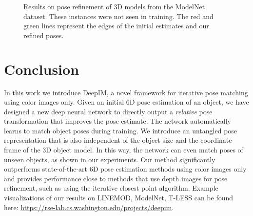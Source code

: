 \documentclass[twocolumn]{svjour3}
\newcommand{\dimnet}[0]{DeepIM}
\begin{document}
\begin{figure*}[!ht]
{}
\hfill
{}
\hfill
{}
\hfill
\caption{Results on pose refinement of 3D models from the ModelNet dataset. These instances were not seen in training. The red and green lines represent the edges of the initial estimates and our refined poses.}
\label{fig.unseen_demo}
\end{figure*}
\fi


%
\section{Conclusion}

In this work we introduce \dimnet, a novel framework for iterative pose matching using color images only. Given an initial 6D pose estimation of an object, we have designed a new deep neural network to directly output a \emph{relative} pose transformation that improves the pose estimate. The network automatically learns to match object poses during training. We introduce an untangled pose representation that is also independent of the object size and the coordinate frame of the 3D object model. In this way, the network can even match poses of unseen objects, as shown in our experiments. Our method significantly outperforms state-of-the-art 6D pose estimation methods using color images only and provides performance close to methods that use depth images for pose refinement, such as using the iterative closest point algorithm. Example visualizations of our results on LINEMOD, ModelNet, T-LESS can be found here: \url{https://rse-lab.cs.washington.edu/projects/deepim}.
\end{document}
